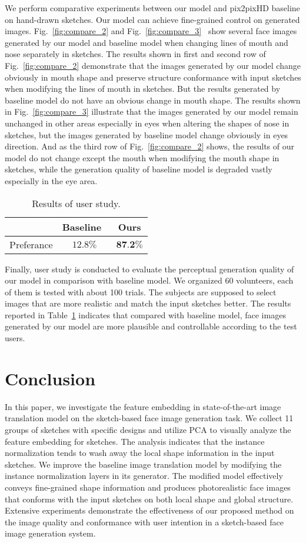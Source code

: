 We perform comparative experiments between our model and pix2pixHD baseline on hand-drawn sketches.
Our model can achieve fine-grained control on generated images. 
Fig.~\ref{fig:compare_2} and Fig.~\ref{fig:compare_3}~ show several face images generated by our model and baseline model when changing lines of mouth and nose separately in sketches.
The results shown in first and second row of Fig.~\ref{fig:compare_2} demonstrate that the images generated by our model change obviously in mouth shape and preserve structure conformance with input sketches when modifying the lines of mouth in sketches. 
But the results generated by baseline model do not have an obvious change in mouth shape.
The results shown in Fig.~\ref{fig:compare_3} illustrate that the images generated by our model remain unchanged in other areas especially in eyes when altering the shapes of nose in sketches, but the images generated by baseline model change obviously in eyes direction. 
And as the third row of Fig.~\ref{fig:compare_2} shows, the results of our model do not change except the mouth when modifying the mouth shape in sketches, while the generation quality of baseline model is degraded vastly especially in the eye area. 

\begin{table}[h]
	\centering	
	\caption{Results of user study.}
	\begin{tabular}{|c|c|c|}\hline
		& Baseline~\cite{pix2pixhd} & Ours \\\hline
		Preferance & $12.8\%$ & $\textbf{87.2\%}$\\\hline
	\end{tabular}
	\label{tab:user_study}
\end{table} 

Finally, user study is conducted to evaluate the perceptual generation quality of our model in comparison with baseline model. 
We organized 60 volunteers, each of them is tested with about 100 trials. The subjects are supposed to select images that are more realistic and match the input sketches better.  
The results reported in Table~\ref{tab:user_study} indicates that compared with baseline model, face images generated by our model are more plausible and controllable according to the test users. 

\section{Conclusion}
In this paper, we investigate the feature embedding in state-of-the-art image translation model on the sketch-based face image generation task.
We collect 11 groups of sketches with specific designs and utilize PCA to visually analyze the feature embedding for sketches.
The analysis indicates that the instance normalization tends to wash away the local shape information in the input sketches.
We improve the baseline image translation model by modifying the instance normalization layers in its generator.
The modified model effectively conveys fine-grained shape information and produces photorealistic face images that conforms with the input sketches on both local shape and global structure.
Extensive experiments demonstrate the effectiveness of our proposed method on the image quality and conformance with user intention in a sketch-based face image generation system.  